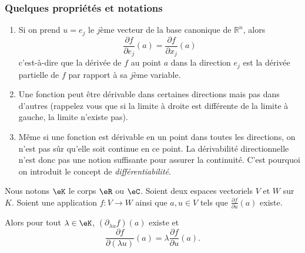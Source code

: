 \subsubsection{Quelques propriétés et notations}

\begin{enumerate}
	\item Si on prend \( u=e_j\) le \( j\)ème vecteur de la base canonique de
	      \( \mathbb{R}^n\), alors
	      \begin{equation}
		      \frac{\partial f}{\partial e_j}(a) = \frac{\partial f}{\partial
			      x_j}(a)
	      \end{equation}
	      c'est-à-dire que la dérivée de \( f\) au point \( a\) dans la
	      direction \( e_j\) est la dérivée partielle de \( f\) par rapport à sa
	      \( j\)ème variable.

	\item
	      Une fonction peut être dérivable dans certaines directions
	      mais pas dans d'autres (rappelez vous que si la limite à droite est
	      différente de la limite à gauche, la limite n'existe pas).

	\item
	      Même si une fonction est dérivable en un point dans toutes les
	      directions, on n'est pas sûr qu'elle soit continue en ce point. La
	      dérivabilité directionnelle n'est donc pas une notion suffisante
	      pour assurer la continuité. C'est pourquoi on introduit le concept
	      de \emph{différentiabilité}.
\end{enumerate}

\begin{lemma}       \label{LEMooVOTHooPJcrWH}
	Nous notons \( \eK\) le corps \( \eR\) ou \( \eC\). Soient deux espaces vectoriels \( V\) et \( W\) sur \( K\). Soient une application \( f\colon V\to W\) ainsi que \( a,u\in V\) tels que \( \frac{ \partial f }{ \partial u }(a)\) existe.

	Alors pour tout \( \lambda\in \eK\), \( (\partial_{\lambda u}f)(a)\) existe et
	\begin{equation}
		\frac{ \partial f }{ \partial (\lambda u) }(a)=\lambda\frac{ \partial f }{ \partial u }(a).
	\end{equation}
\end{lemma}

